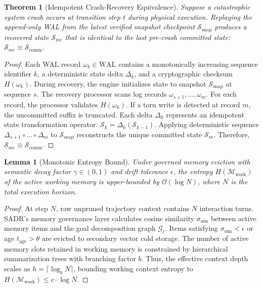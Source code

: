\documentclass[10pt,journal,compsoc]{IEEEtran}
\newtheorem{theorem}{Theorem}
\newtheorem{lemma}{Lemma}
\begin{document}
\begin{theorem}[Idempotent Crash-Recovery Equivalence]
Suppose a catastrophic system crash occurs at transition step $t$ during physical execution. Replaying the append-only WAL from the latest verified snapshot checkpoint $\mathcal{S}_{\text{snap}}$ produces a recovered state $\mathcal{S}_{\text{rec}}$ that is identical to the last pre-crash committed state: $\mathcal{S}_{\text{rec}} \equiv \mathcal{S}_{\text{comm}}$.
\end{theorem}

\begin{proof}
Each WAL record $\omega_k \in \text{WAL}$ contains a monotonically increasing sequence identifier $k$, a deterministic state delta $\Delta_k$, and a cryptographic checksum $H(\omega_k)$. During recovery, the engine initializes state to snapshot $\mathcal{S}_{\text{snap}}$ at sequence $s$. The recovery processor scans log records $\omega_{s+1}, \dots, \omega_m$. For each record, the processor validates $H(\omega_k)$. If a torn write is detected at record $m$, the uncommitted suffix is truncated. Each delta $\Delta_k$ represents an idempotent state transformation operator: $\mathcal{S}_k = \Delta_k(\mathcal{S}_{k-1})$. Applying deterministic sequence $\Delta_{s+1} \circ \dots \circ \Delta_m$ to $\mathcal{S}_{\text{snap}}$ reconstructs the unique committed state $\mathcal{S}_m$. Therefore, $\mathcal{S}_{\text{rec}} \equiv \mathcal{S}_{\text{comm}}$.
\end{proof}

\begin{lemma}[Monotonic Entropy Bound]
Under governed memory eviction with semantic decay factor $\gamma \in (0, 1)$ and drift tolerance $\epsilon$, the entropy $H(\mathcal{M}_{\text{work}})$ of the active working memory is upper-bounded by $\mathcal{O}(\log N)$, where $N$ is the total execution horizon.
\end{lemma}

\begin{proof}
At step $N$, raw unpruned trajectory context contains $N$ interaction turns. SADR's memory governance layer calculates cosine similarity $\sigma_{\text{sim}}$ between active memory items and the goal decomposition graph $\mathcal{G}_t$. Items satisfying $\sigma_{\text{sim}} < \epsilon$ or age $t_{\text{age}} > \theta$ are evicted to secondary vector cold storage. The number of active memory slots retained in working memory is constrained by hierarchical summarization trees with branching factor $b$. Thus, the effective context depth scales as $h = \lceil\log_b N\rceil$, bounding working context entropy to $H(\mathcal{M}_{\text{work}}) \le c \cdot \log N$.
\end{proof}
\end{document}
